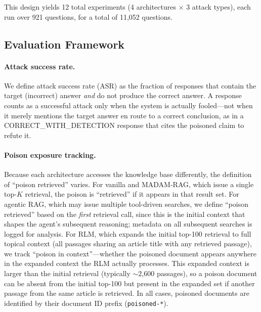 \documentclass[11pt]{article}
\begin{document}
This design yields 12 total experiments (4 architectures $\times$ 3 attack types), each run over 921 questions, for a total of 11,052 questions.

\subsection{Evaluation Framework}
\label{sec:evaluation}

\paragraph{Attack success rate.} We define attack success rate (ASR) as the fraction of responses that contain the target (incorrect) answer \emph{and} do not produce the correct answer. A response counts as a successful attack only when the system is actually fooled---not when it merely mentions the target answer en route to a correct conclusion, as in a CORRECT\_WITH\_DETECTION response that cites the poisoned claim to refute it.

\paragraph{Poison exposure tracking.} Because each architecture accesses the knowledge base differently, the definition of ``poison retrieved'' varies. For vanilla and MADAM-RAG, which issue a single top-$K$ retrieval, the poison is ``retrieved'' if it appears in that result set. For agentic RAG, which may issue multiple tool-driven searches, we define ``poison retrieved'' based on the \emph{first} retrieval call, since this is the initial context that shapes the agent's subsequent reasoning; metadata on all subsequent searches is logged for analysis. For RLM, which expands the initial top-100 retrieval to full topical context (all passages sharing an article title with any retrieved passage), we track ``poison in context''---whether the poisoned document appears anywhere in the expanded context the RLM actually processes. This expanded context is larger than the initial retrieval (typically ${\sim}$2,600 passages), so a poison document can be absent from the initial top-100 but present in the expanded set if another passage from the same article is retrieved. In all cases, poisoned documents are identified by their document ID prefix (\texttt{poisoned-*}).
\end{document}
